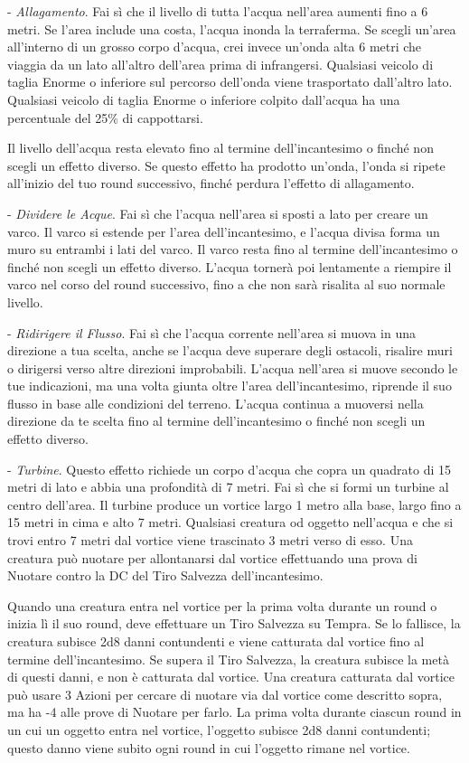 \begin{multicols}{2}
\medskip

- \emph{Allagamento}. Fai sì che il livello di tutta l'acqua nell'area aumenti fino a 6 metri. Se l'area include una costa, l'acqua inonda la terraferma. Se scegli un'area all'interno di un grosso corpo d'acqua, crei invece un'onda alta 6 metri che viaggia da un lato all'altro dell'area prima di infrangersi. Qualsiasi veicolo di taglia Enorme o inferiore sul percorso dell'onda viene trasportato dall'altro lato. Qualsiasi veicolo di taglia Enorme o inferiore colpito dall'acqua ha una percentuale del 25\% di cappottarsi.

Il livello dell'acqua resta elevato fino al termine dell'incantesimo o finché non scegli un effetto diverso. Se questo effetto ha prodotto un'onda, l'onda si ripete all'inizio del tuo round successivo, finché perdura l'effetto di allagamento.

- \emph{Dividere le Acque}. Fai sì che l'acqua nell'area si sposti a lato per creare un varco. Il varco si estende per l'area dell'incantesimo, e l'acqua divisa forma un muro su entrambi i lati del varco. Il varco resta fino al termine dell'incantesimo o finché non scegli un effetto diverso. L'acqua tornerà poi lentamente a riempire il varco nel corso del round successivo, fino a che non sarà risalita al suo normale livello.

- \emph{Ridirigere il Flusso}. Fai sì che l'acqua corrente nell'area si muova in una direzione a tua scelta, anche se l'acqua deve superare degli ostacoli, risalire muri o dirigersi verso altre direzioni improbabili. L'acqua nell'area si muove secondo le tue indicazioni, ma una volta giunta oltre l'area dell'incantesimo, riprende il suo flusso in base alle condizioni del terreno. L'acqua continua a muoversi nella direzione da te scelta fino al termine dell'incantesimo o finché non scegli un effetto diverso.

- \emph{Turbine}. Questo effetto richiede un corpo d'acqua che copra un quadrato di 15 metri di lato e abbia una profondità di 7 metri. Fai sì che si formi un turbine al centro dell'area. Il turbine produce un vortice largo 1 metro alla base, largo fino a 15 metri in cima e alto 7 metri. Qualsiasi creatura od oggetto nell'acqua e che si trovi entro 7 metri dal vortice viene trascinato 3 metri verso di esso. Una creatura può nuotare per allontanarsi dal vortice effettuando una prova di Nuotare contro la DC del Tiro Salvezza dell'incantesimo.

Quando una creatura entra nel vortice per la prima volta durante un round o inizia lì il suo round, deve effettuare un Tiro Salvezza su Tempra. Se lo fallisce, la creatura subisce 2d8 danni contundenti e viene catturata dal vortice fino al termine dell'incantesimo. Se supera il Tiro Salvezza, la creatura subisce la metà di questi danni, e non è catturata dal vortice. Una creatura catturata dal vortice può usare 3 Azioni per cercare di nuotare via dal vortice come descritto sopra, ma ha -4 alle prove di Nuotare per farlo. La prima volta durante ciascun round in un cui un oggetto entra nel vortice, l'oggetto subisce 2d8 danni contundenti; questo danno viene subito ogni round in cui l'oggetto rimane nel vortice.


\end{multicols}
